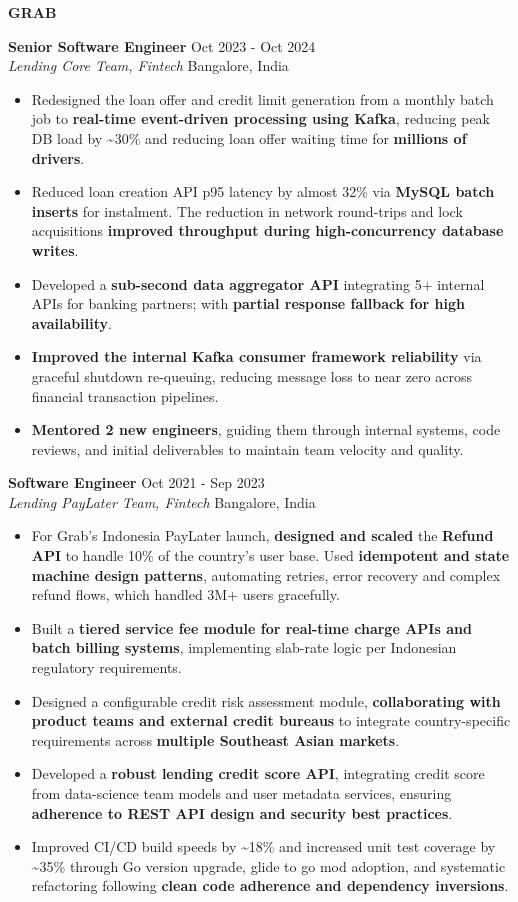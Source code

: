 \documentclass[11pt,a4paper]{article}
\newcommand{\companyheader}[1]{%
    \vspace{3pt}%
    {\Large\bfseries #1}%
    \vspace{3pt}%
}
\newcommand{\roleblock}[5]{%
    \vspace{2pt}%
    \noindent%
    \textbf{#1} \hfill #2 \\%
    \textit{#3} \hfill #4 \vspace{3pt}%
    \begin{itemize}[%
        leftmargin=*,%
        noitemsep,%
        topsep=1pt,%
        label={\small\textbullet},%
        itemsep=0pt%
    ]%
    \RaggedRight%
    \def\baselinestretch{1.0}%
        #5%
    \end{itemize}%
    \vspace{1pt}%
}
\begin{document}
\vspace{2pt}

\companyheader{GRAB}

\roleblock
{Senior Software Engineer}
{Oct 2023 - Oct 2024}
{Lending Core Team, Fintech}
{Bangalore, India}
{
    \item Redesigned the loan offer and credit limit generation from a monthly batch job to \textbf{real-time event-driven processing using Kafka}, reducing peak DB load by \textasciitilde30\% and reducing loan offer waiting time for \textbf{millions of drivers}.
    \item Reduced loan creation API p95 latency by almost 32\% via \textbf{MySQL batch inserts} for instalment. The reduction in network round-trips and lock acquisitions \textbf{improved throughput during high-concurrency database writes}. 
    \item Developed a \textbf{sub-second data aggregator API} integrating 5+ internal APIs for banking partners; with \textbf{partial response fallback for high availability}.
    \item \textbf{Improved the internal Kafka consumer framework reliability} via graceful shutdown re-queuing, reducing message loss to near zero across financial transaction pipelines.
    \item \textbf{Mentored 2 new engineers}, guiding them through internal systems, code reviews, and initial deliverables to maintain team velocity and quality.
}
\vspace{2pt}

\roleblock
{Software Engineer}
{Oct 2021 - Sep 2023}
{Lending PayLater Team, Fintech}
{Bangalore, India}
{
    \item For Grab's Indonesia PayLater launch, \textbf{designed and scaled} the \textbf{Refund API} to handle 10\% of the country's user base. Used \textbf{idempotent and state machine design patterns}, automating retries, error recovery and complex refund flows, which handled 3M+ users gracefully.
    \item Built a \textbf{tiered service fee module for real-time charge APIs and batch billing systems}, implementing slab-rate logic per Indonesian regulatory requirements.
    \item Designed a configurable credit risk assessment module, \textbf{collaborating with product teams and external credit bureaus} to integrate country-specific requirements across \textbf{multiple Southeast Asian markets}.
    \item Developed a \textbf{robust lending credit score API}, integrating credit score from data-science team models and user metadata services, ensuring \textbf{adherence to REST API design and security best practices}.
    \item Improved CI/CD build speeds by \textasciitilde18\% and increased unit test coverage by \textasciitilde35\% through Go version upgrade, glide to go mod adoption, and systematic refactoring following \textbf{clean code adherence and dependency inversions}.
}
\end{document}
